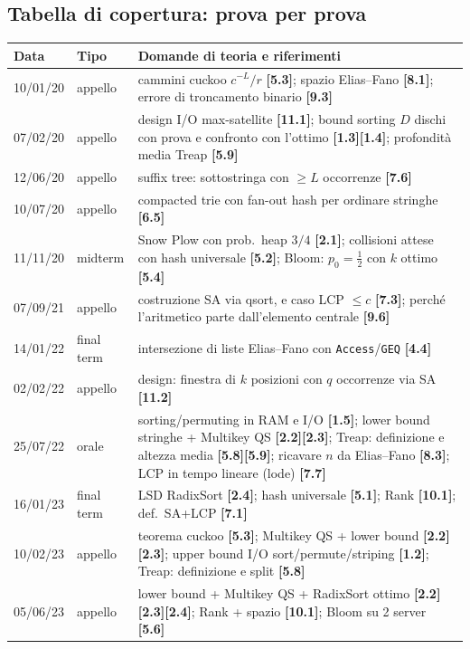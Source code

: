 \documentclass[11pt,a4paper]{article}
\newcommand{\qid}[1]{\textbf{[#1]}}
\begin{document}
\subsection*{Tabella di copertura: prova per prova}

\begin{longtable}{@{}p{2.6cm}p{2.2cm}p{10.2cm}@{}}
\textbf{Data} & \textbf{Tipo} & \textbf{Domande di teoria e riferimenti}\\
\hline
\endhead
10/01/20 & appello & cammini cuckoo $c^{-L}/r$ \qid{5.3}; spazio Elias--Fano \qid{8.1}; errore di troncamento binario \qid{9.3}\\
07/02/20 & appello & design I/O max-satellite \qid{11.1}; bound sorting $D$ dischi con prova e confronto con l'ottimo \qid{1.3}\qid{1.4}; profondit\`a media Treap \qid{5.9}\\
12/06/20 & appello & suffix tree: sottostringa con $\ge L$ occorrenze \qid{7.6}\\
10/07/20 & appello & compacted trie con fan-out hash per ordinare stringhe \qid{6.5}\\
11/11/20 & midterm & Snow Plow con prob.\ heap $3/4$ \qid{2.1}; collisioni attese con hash universale \qid{5.2}; Bloom: $p_0=\tfrac12$ con $k$ ottimo \qid{5.4}\\
07/09/21 & appello & costruzione SA via qsort, e caso LCP $\le c$ \qid{7.3}; perch\'e l'aritmetico parte dall'elemento centrale \qid{9.6}\\
14/01/22 & final term & intersezione di liste Elias--Fano con \texttt{Access}/\texttt{GEQ} \qid{4.4}\\
02/02/22 & appello & design: finestra di $k$ posizioni con $q$ occorrenze via SA \qid{11.2}\\
25/07/22 & orale & sorting/permuting in RAM e I/O \qid{1.5}; lower bound stringhe + Multikey QS \qid{2.2}\qid{2.3}; Treap: definizione e altezza media \qid{5.8}\qid{5.9}; ricavare $n$ da Elias--Fano \qid{8.3}; LCP in tempo lineare (lode) \qid{7.7}\\
16/01/23 & final term & LSD RadixSort \qid{2.4}; hash universale \qid{5.1}; Rank \qid{10.1}; def.\ SA+LCP \qid{7.1}\\
10/02/23 & appello & teorema cuckoo \qid{5.3}; Multikey QS + lower bound \qid{2.2}\qid{2.3}; upper bound I/O sort/permute/striping \qid{1.2}; Treap: definizione e split \qid{5.8}\\
05/06/23 & appello & lower bound + Multikey QS + RadixSort ottimo \qid{2.2}\qid{2.3}\qid{2.4}; Rank + spazio \qid{10.1}; Bloom su 2 server \qid{5.6}\\

\end{longtable}
\end{document}
